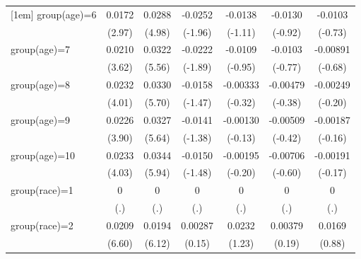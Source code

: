 \begin{table}[htbp]
\begin{tabular}{l*{6}{c}}
[1em]
group(age)=6        &      0.0172\sym{**} &      0.0288\sym{***}&     -0.0252         &     -0.0138         &     -0.0130         &     -0.0103         \\
                    &      (2.97)         &      (4.98)         &     (-1.96)         &     (-1.11)         &     (-0.92)         &     (-0.73)         \\
[1em]
group(age)=7        &      0.0210\sym{***}&      0.0322\sym{***}&     -0.0222         &     -0.0109         &     -0.0103         &    -0.00891         \\
                    &      (3.62)         &      (5.56)         &     (-1.89)         &     (-0.95)         &     (-0.77)         &     (-0.68)         \\
[1em]
group(age)=8        &      0.0232\sym{***}&      0.0330\sym{***}&     -0.0158         &    -0.00333         &    -0.00479         &    -0.00249         \\
                    &      (4.01)         &      (5.70)         &     (-1.47)         &     (-0.32)         &     (-0.38)         &     (-0.20)         \\
[1em]
group(age)=9        &      0.0226\sym{***}&      0.0327\sym{***}&     -0.0141         &    -0.00130         &    -0.00509         &    -0.00187         \\
                    &      (3.90)         &      (5.64)         &     (-1.38)         &     (-0.13)         &     (-0.42)         &     (-0.16)         \\
[1em]
group(age)=10       &      0.0233\sym{***}&      0.0344\sym{***}&     -0.0150         &    -0.00195         &    -0.00706         &    -0.00191         \\
                    &      (4.03)         &      (5.94)         &     (-1.48)         &     (-0.20)         &     (-0.60)         &     (-0.17)         \\
[1em]
group(race)=1       &           0         &           0         &           0         &           0         &           0         &           0         \\
                    &         (.)         &         (.)         &         (.)         &         (.)         &         (.)         &         (.)         \\
[1em]
group(race)=2       &      0.0209\sym{***}&      0.0194\sym{***}&     0.00287         &      0.0232         &     0.00379         &      0.0169         \\
                    &      (6.60)         &      (6.12)         &      (0.15)         &      (1.23)         &      (0.19)         &      (0.88)         \\

\end{tabular}
\end{table}
